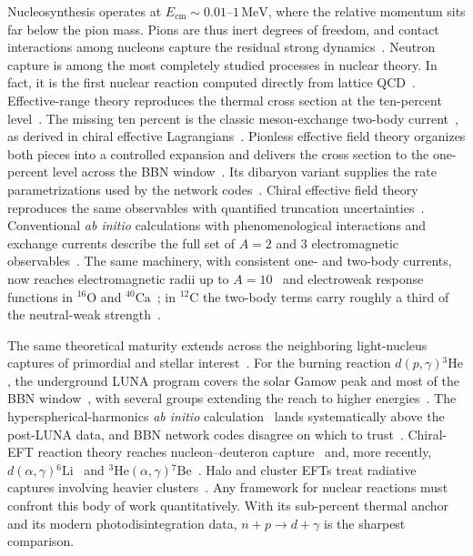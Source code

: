 \documentclass[
  aps,prd,twocolumn,nofootinbib,superscriptaddress,
  longbibliography,floatfix,preprintnumbers
]{revtex4-2}
\newcommand{\npdg}{n+p\to d+\gamma}
\newcommand{\dpHe}{d(p,\gamma){}^{3}\mathrm{He}}
\begin{document}
Nucleosynthesis operates at $E_{\mathrm{cm}}\sim0.01$--$1\,\mathrm{MeV}$, where
the relative momentum sits far below the pion mass. Pions are thus inert
degrees of freedom, and contact interactions among nucleons capture the residual strong
dynamics~\cite{Chen:1999tn}. Neutron capture is among the most completely
studied processes in nuclear theory. In fact, it is the first nuclear reaction computed directly from lattice QCD~\cite{Beane:2015yha}.
Effective-range theory reproduces the
thermal cross section at the ten-percent level~\cite{Bethe:1950jm}. The missing
ten percent is the classic meson-exchange two-body current~\cite{Riska:1972zz},
as derived in chiral effective Lagrangians~\cite{Park:1994sr}. Pionless
effective field theory organizes both pieces into a controlled expansion and
delivers the cross section to the one-percent level across the BBN
window~\cite{Chen:1999tn,Rupak:1999rk}. Its dibaryon variant supplies the rate
parametrizations used by the network codes~\cite{Ando:2005cz}. Chiral effective
field theory~\cite{Epelbaum:2008ga,Machleidt:2011zz} reproduces the same
observables with quantified truncation
uncertainties~\cite{Acharya:2021lrv,Du:2022zds}. Conventional {\it ab initio}
calculations with phenomenological interactions and exchange currents describe
the full set of $A=2$ and $3$ electromagnetic observables~\cite{Marcucci:2005zc}.
The same machinery, with consistent one- and two-body currents, now reaches
electromagnetic radii up to $A=10$~\cite{King:2025akz} and electroweak response
functions in ${}^{16}\mathrm{O}$ and
${}^{40}\mathrm{Ca}$~\cite{Acharya:2024xah,Sobczyk:2021dwm}; in
${}^{12}\mathrm{C}$ the two-body terms carry roughly a third of the neutral-weak
strength~\cite{Lovato:2014eva}.

The same theoretical maturity extends across the neighboring light-nucleus
captures of primordial and stellar
interest~\cite{Adelberger:2010qa,Acharya:2024lke}. For the burning reaction
$\dpHe$, the underground LUNA program covers the solar Gamow peak and most of
the BBN window~\cite{Casella:2002yej,Mossa:2020gjc,Stockel:2024hde}, with
several groups extending the reach to higher
energies~\cite{Tisma:2019acf,Turkat:2021qmq,Schmid:1997zz}. The
hyperspherical-harmonics {\it ab initio} calculation~\cite{Marcucci:2015yla}
lands systematically above the post-LUNA data, and BBN network codes disagree on
which to trust~\cite{Pitrou:2018cgg,Gariazzo:2021iiu,Moscoso:2021xog}. Chiral-EFT reaction
theory reaches nucleon--deuteron capture~\cite{Skibinski:2006gy} and, more
recently, $d(\alpha,\gamma){}^{6}\mathrm{Li}$~\cite{Hebborn:2022iiz} and
${}^{3}\mathrm{He}(\alpha,\gamma){}^{7}\mathrm{Be}$~\cite{Atkinson:2024zrm}.
Halo and cluster EFTs treat radiative captures involving heavier
clusters~\cite{Bertulani:2002sz,Bedaque:2003wa,Rupak:2016mmz}. Any framework
for nuclear reactions must confront this body of work quantitatively. With its
sub-percent thermal anchor and its modern photodisintegration data, $\npdg$ is the sharpest comparison.
\end{document}

